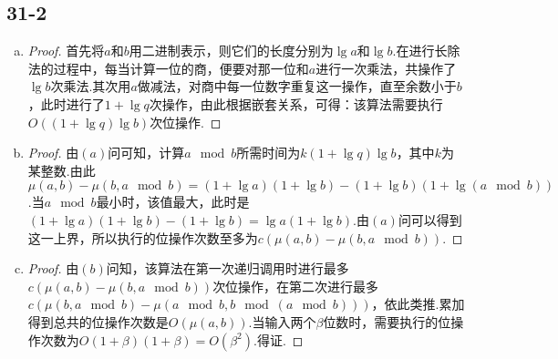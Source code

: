 \documentclass[twocolumn]{article}
\newenvironment{SChinese}{
	\CJKfamily{gbsn}
	\CJKtilde
	\CJKnospace}{}
\begin{document}
\begin{CJK}{UTF8}{}
\begin{SChinese}
			\subsection*{31-2}
				\begin{enumerate}[a.]
					\item \begin{proof}
						首先将$a$和$b$用二进制表示，则它们的长度分别为$\lg a$和$\lg b$.在进行长除法的过程中，每当计算一位的商，便要对那一位和$a$进行一次乘法，共操作了$\lg b$次乘法.其次用$a$做减法，对商中每一位数字重复这一操作，直至余数小于$b$，此时进行了$1+\lg q$次操作，由此根据嵌套关系，可得：该算法需要执行$O((1+\lg q)\lg b)$次位操作.
					\end{proof}
					\item \begin{proof}
						由$(a)$问可知，计算$a\mod b$所需时间为$k(1+\lg q)\lg b$，其中$k$为某整数.由此$\mu(a,b)-\mu(b,a\mod b)=(1+\lg a)(1+\lg b)-(1+\lg b)(1+\lg(a\mod b))$.当$a\mod b$最小时，该值最大，此时是$(1+\lg a)(1+\lg b)-(1+\lg b)=\lg a(1+\lg b)$.由$(a)$问可以得到这一上界，所以执行的位操作次数至多为$c(\mu(a,b)-\mu(b,a\mod b))$.
					\end{proof}
					\item \begin{proof}
						由$(b)$问知，该算法在第一次递归调用时进行最多$c(\mu(a,b)-\mu(b,a\mod b))$次位操作，在第二次进行最多$c(\mu(b,a\mod b)-\mu(a\mod b,b\mod(a\mod b)))$，依此类推.累加得到总共的位操作次数是$O(\mu(a,b))$.当输入两个$\beta$位数时，需要执行的位操作次数为$O(1+\beta)(1+\beta)=O(\beta^2)$.得证.
					\end{proof}
				\end{enumerate}

\end{SChinese}
\end{CJK}
\end{document}
